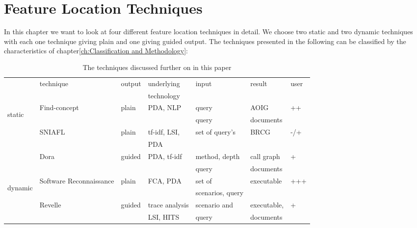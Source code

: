 \chapter{Feature Location Techniques}

In this chapter we want to look at four different feature location techniques in detail. We choose two static and two dynamic techniques with each one technique giving plain and one giving guided output. The techniques presented in the following can be classified by the characteristics of chapter\ref{ch:Classification and Methodology}:

\begin{table}[h]
	\hspace{-3em}
	\begin{tabular}{|l| l l l l l l|}
		\hline
		 & technique &  output & underlying & input & result & user \\ 
		 &  &  &  technology &  &  &  \\ \hline
		 \multirow{5}{1em}{\begin{sideways} static \end{sideways}}
		 & Find-concept  & plain & PDA, NLP & query & AOIG & ++  \\
		 &      &        &             & query         & documents  &   \\
		 & SNIAFL & plain & tf-idf, LSI, & set of query's & BRCG & -/+ \\ 
		 &        &       & PDA  &             &      &
		 \\ 
		 & Dora & guided & PDA, tf-idf & method, depth & call graph & + \\ 
		 &      &        &             & query         & documents  &   \\ \hline
		 \multirow{4}{1em}{\begin{sideways} dynamic \end{sideways}}
		 & Software Reconnaissance  & plain & FCA, PDA & set of & executable & +++ \\ 
		 &   &  &  & scenarios, query & & \\
		 & Revelle  & guided & trace analysis & scenario and & executable, & +\\
		 &   &  & LSI, HITS & query & documents & \\ \hline
		
	\end{tabular}
	\caption{The techniques discussed further on in this paper}
	\label{tab:techniques overview}
\end{table}

